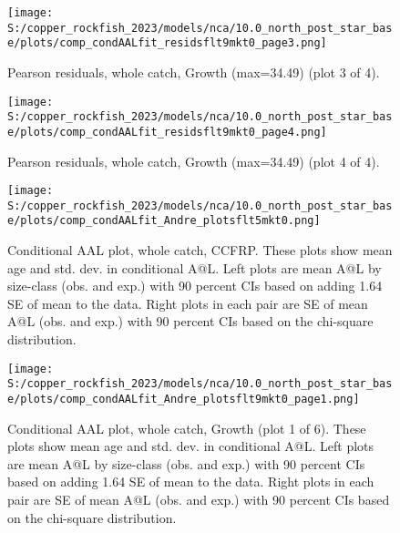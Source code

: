 \documentclass[11pt,
  letterpaper,
]{article}
\begin{document}
\begin{figure}
{\centering
\texttt{[image: S:/copper\_rockfish\_2023/models/nca/10.0\_north\_post\_star\_base/plots/comp\_condAALfit\_residsflt9mkt0\_page3.png]}
}
\caption{Pearson residuals, whole catch, Growth (max=34.49) (plot 3 of 4).\label{fig:comp-condAALfit-residsflt9mkt0-page3}}
\end{figure}

\begin{figure}
{\centering
\texttt{[image: S:/copper\_rockfish\_2023/models/nca/10.0\_north\_post\_star\_base/plots/comp\_condAALfit\_residsflt9mkt0\_page4.png]}
}
\caption{Pearson residuals, whole catch, Growth (max=34.49) (plot 4 of 4).\label{fig:comp-condAALfit-residsflt9mkt0-page4}}
\end{figure}

\begin{figure}
{\centering
\texttt{[image: S:/copper\_rockfish\_2023/models/nca/10.0\_north\_post\_star\_base/plots/comp\_condAALfit\_Andre\_plotsflt5mkt0.png]}
}
\caption{Conditional AAL plot, whole catch, CCFRP. These plots show mean age and std. dev. in conditional A@L. Left plots are mean A@L by size-class (obs. and exp.) with 90 percent CIs based on adding 1.64 SE of mean to the data. Right plots in each pair are SE of mean A@L (obs. and exp.) with 90 percent CIs based on the chi-square distribution.\label{fig:comp-condAALfit-Andre-plotsflt5mkt0}}
\end{figure}

\begin{figure}
{\centering
\texttt{[image: S:/copper\_rockfish\_2023/models/nca/10.0\_north\_post\_star\_base/plots/comp\_condAALfit\_Andre\_plotsflt9mkt0\_page1.png]}
}
\caption{Conditional AAL plot, whole catch, Growth (plot 1 of 6). These plots show mean age and std. dev. in conditional A@L. Left plots are mean A@L by size-class (obs. and exp.) with 90 percent CIs based on adding 1.64 SE of mean to the data. Right plots in each pair are SE of mean A@L (obs. and exp.) with 90 percent CIs based on the chi-square distribution.\label{fig:comp-condAALfit-Andre-plotsflt9mkt0-page1}}
\end{figure}
\end{document}
